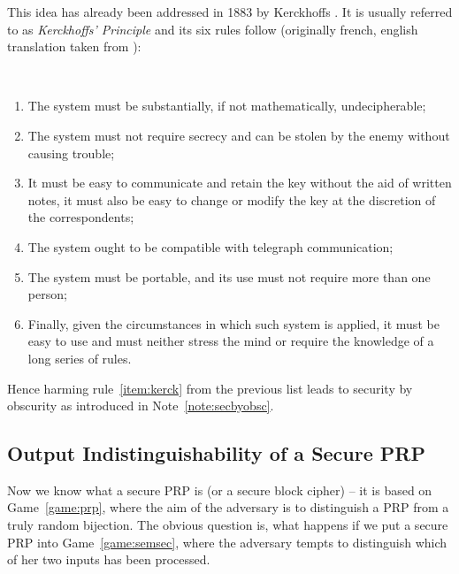 This idea has already been addressed in 1883 by Kerckhoffs \cite{auguste1883cryptographie}. It is usually referred to as {\em Kerckhoffs' Principle} and its six rules follow (originally french, english translation taken from \cite{petitcolas2016kerckhoffs}):
\begin{princ}[Kerckhoffs]
	~
	\begin{enumerate}
		\item The system must be substantially, if not mathematically, undecipherable;
		\item The system must not require secrecy and can be stolen by the enemy without causing trouble;\label{item:kerck}
		\item It must be easy to communicate and retain the key without the aid of written notes, it must also be easy to change or modify the key at the discretion of the correspondents;
		\item The system ought to be compatible with telegraph communication;
		\item The system must be portable, and its use must not require more than one person;
		\item Finally, given the circumstances in which such system is applied, it must be easy to use and must neither stress the mind or require the knowledge of a long series of rules.
	\end{enumerate}
\end{princ}
Hence harming rule~\ref{item:kerck} from the previous list leads to security by obscurity as introduced in Note~\ref{note:secbyobsc}.



\subsection{Output Indistinguishability of a Secure PRP}

Now we know what a secure PRP is (or a secure block cipher) -- it is based on Game~\ref{game:prp}, where the aim of the adversary is to distinguish a PRP from a truly random bijection. The obvious question is, what happens if we put a secure PRP into Game~\ref{game:semsec}, where the adversary tempts to distinguish which of her two inputs has been processed.

